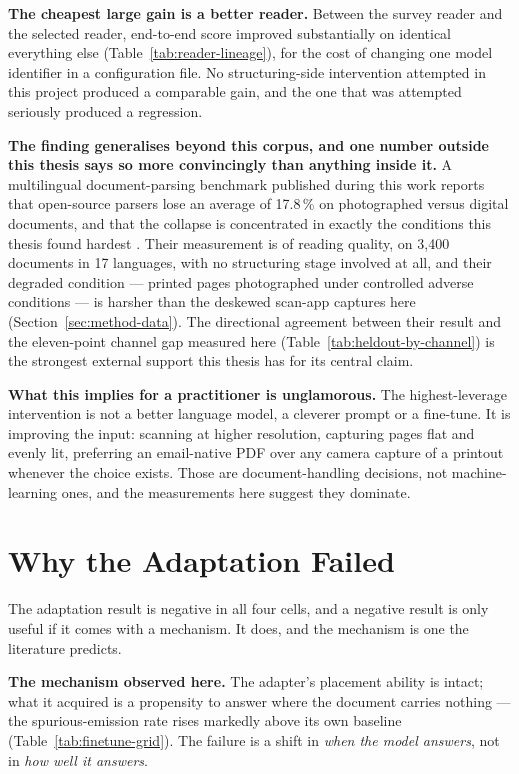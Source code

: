 \textbf{The cheapest large gain is a better reader.} Between the survey reader and the selected
reader, end-to-end score improved substantially on identical everything else
(Table~\ref{tab:reader-lineage}), for the cost of changing one model identifier in a
configuration file. No structuring-side intervention attempted in this project produced a
comparable gain, and the one that was attempted seriously produced a regression.

\textbf{The finding generalises beyond this corpus, and one number outside this thesis says so
more convincingly than anything inside it.} A multilingual document-parsing benchmark published
during this work reports that open-source parsers lose an average of 17.8\,\% on photographed
versus digital documents, and that the collapse is concentrated in exactly the conditions this
thesis found hardest \parencite{mdpbench2026}. Their measurement is of reading quality, on 3{,}400
documents in 17 languages, with no structuring stage involved at all, and their degraded
condition --- printed pages photographed under controlled adverse conditions --- is harsher
than the deskewed scan-app captures here (Section~\ref{sec:method-data}). The directional agreement
between their result and the eleven-point channel gap measured here
(Table~\ref{tab:heldout-by-channel}) is the strongest external support this thesis has for its
central claim.

\textbf{What this implies for a practitioner is unglamorous.} The highest-leverage intervention
is not a better language model, a cleverer prompt or a fine-tune. It is improving the input:
scanning at higher resolution, capturing pages flat and evenly lit, preferring an
email-native \ac{PDF} over any camera capture of a printout whenever the choice exists. Those are
document-handling decisions, not machine-learning ones, and the measurements here suggest they
dominate.

\section{Why the Adaptation Failed}
\label{sec:disc-finetune}

The adaptation result is negative in all four cells, and a negative result is only useful if it
comes with a mechanism. It does, and the mechanism is one the literature predicts.

\textbf{The mechanism observed here.} The adapter's placement ability is intact; what it
acquired is a propensity to answer where the document carries nothing --- the spurious-emission
rate rises markedly above its own baseline (Table~\ref{tab:finetune-grid}). The failure is a shift in
\emph{when the model answers}, not in \emph{how well it answers}.

